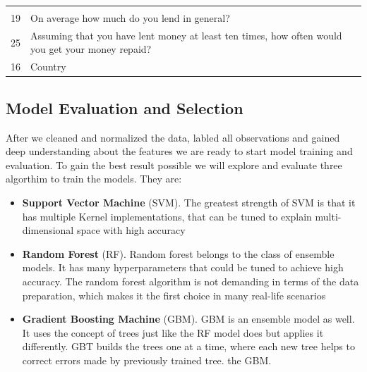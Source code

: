 \begin{longtable}[]{@{}ll@{}}
\begin{minipage}[t]{0.89\columnwidth}
\end{minipage}\tabularnewline
\begin{minipage}[t]{0.05\columnwidth}\raggedright
19\strut
\end{minipage} & \begin{minipage}[t]{0.89\columnwidth}\raggedright
On average how much do you lend in general?\strut
\end{minipage}\tabularnewline
\begin{minipage}[t]{0.05\columnwidth}\raggedright
25\strut
\end{minipage} & \begin{minipage}[t]{0.89\columnwidth}\raggedright
Assuming that you have lent money at least ten times, how often would
you get your money repaid?\strut
\end{minipage}\tabularnewline
\begin{minipage}[t]{0.05\columnwidth}\raggedright
16\strut
\end{minipage} & \begin{minipage}[t]{0.89\columnwidth}\raggedright
Country\strut
\end{minipage}\tabularnewline
\bottomrule
\end{longtable}

\hypertarget{model-evaluation-and-selection}{%
\subsection{Model Evaluation and
Selection}\label{model-evaluation-and-selection}}

After we cleaned and normalized the data, labled all observations and
gained deep understanding about the features we are ready to start model
training and evaluation. To gain the best result possible we will
explore and evaluate three algorthim to train the models. They are:

\begin{itemize}
\tightlist
\item
  \textbf{Support Vector Machine} (SVM). The greatest strength of SVM is
  that it has multiple Kernel implementations, that can be tuned to
  explain multi-dimensional space with high accuracy
\item
  \textbf{Random Forest} (RF). Random forest belongs to the class of
  ensemble models. It has many hyperparameters that could be tuned to
  achieve high accuracy. The random forest algorithm is not demanding in
  terms of the data preparation, which makes it the first choice in many
  real-life scenarios
\item
  \textbf{Gradient Boosting Machine} (GBM). GBM is an ensemble model as
  well. It uses the concept of trees just like the RF model does but
  applies it differently. GBT builds the trees one at a time, where each
  new tree helps to correct errors made by previously trained tree. the
  GBM.
\end{itemize}


